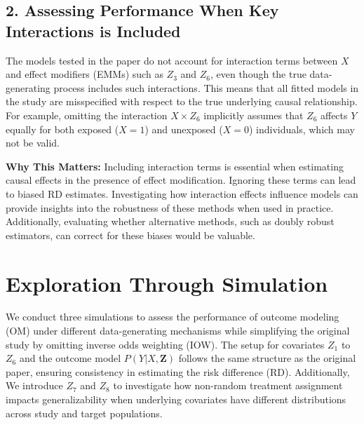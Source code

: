 \documentclass[12pt,oneside]{amsart}
\theoremstyle{definition}
\theoremstyle{remark}
\numberwithin{equation}{section}
\begin{document}
\subsection{2. Assessing Performance When Key Interactions is Included}

The models tested in the paper do not account for interaction terms between \( X \) and effect modifiers (EMMs) such as \( Z_3 \) and \( Z_6 \), even though the true data-generating process includes such interactions. This means that all fitted models in the study are misspecified with respect to the true underlying causal relationship. For example, omitting the interaction \( X \times Z_6 \) implicitly assumes that \( Z_6 \) affects \( Y \) equally for both exposed (\( X=1 \)) and unexposed (\( X=0 \)) individuals, which may not be valid.

\textbf{Why This Matters:} Including interaction terms is essential when estimating causal effects in the presence of effect modification. Ignoring these terms can lead to biased RD estimates. Investigating how interaction effects influence models can provide insights into the robustness of these methods when used in practice. Additionally, evaluating whether alternative methods, such as doubly robust estimators, can correct for these biases would be valuable.

\section{Exploration Through Simulation}
We conduct three simulations to assess the performance of outcome modeling (OM) under different data-generating mechanisms while simplifying the original study by omitting inverse odds weighting (IOW). The setup for covariates $Z_1$ to $Z_6$ and the outcome model $P(Y|X, \textbf{Z})$ follows the same structure as the original paper, ensuring consistency in estimating the risk difference (RD). Additionally, We introduce $Z_7$ and $Z_8$ to investigate how non-random treatment assignment impacts generalizability when underlying covariates have different distributions across study and target populations. 
\end{document}
